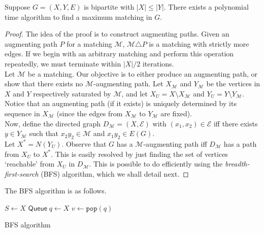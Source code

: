 			\begin{ftheo}
				Suppose $G = (X,Y,E)$ is bipartite with $|X| \le |Y|$. There exists a polynomial time algorithm to find a maximum matching in $G$.
			\end{ftheo}
			\begin{proof}
				The idea of the proof is to construct augmenting paths. Given an augmenting path $P$ for a matching $\mathcal{M}$, $\mathcal{M}\triangle P$ is a matching with strictly more edges. If we begin with an arbitrary matching and perform this operation repeatedly, we must terminate within $|X|/2$ iterations.\\
				Let $\mathcal{M}$ be a matching. Our objective is to either produce an augmenting path, or show that there exists no $\mathcal{M}$-augmenting path. Let $X_\mathcal{M}$ and $Y_\mathcal{M}$ be the vertices in $X$ and $Y$ respectively saturated by $\mathcal{M}$, and let $X_U = X \setminus X_\mathcal{M}$ and $Y_U = Y \setminus Y_\mathcal{M}$. Notice that an augmenting path (if it exists) is uniquely determined by its sequence in $X_\mathcal{M}$ (since the edges from $X_\mathcal{M}$ to $Y_\mathcal{M}$ are fixed).\\
				Now, define the directed graph $D_\mathcal{M} = (X,\mathcal{E})$ with $(x_1, x_2) \in \mathcal{E}$ iff there exists $y \in Y_\mathcal{M}$ such that $x_2y_2\in\mathcal{M}$ and $x_1y_2\in E(G)$.\\
				Let $X^* = N(Y_U)$. Observe that $G$ has a $\mathcal{M}$-augmenting path iff $D_\mathcal{M}$ has a path from $X_U$ to $X^*$. This is easily resolved by just finding the set of vertices `reachable' from $X_U$ in $D_\mathcal{M}$. This is possible to do efficiently using the \emph{breadth-first-search} (BFS) algorithm, which we shall detail next.
			\end{proof}


			The BFS algorithm is as follows.

			\begin{algorithm}[H]
				\DontPrintSemicolon
				\SetNoFillComment		
				$S\gets X$\;
				$\mathsf{Queue}\; q \gets X$ 
				 {
					$v \gets \texttt{pop}(q)$\;
				}
				\caption{BFS algorithm}\label{algo: bfs}
			\end{algorithm}


